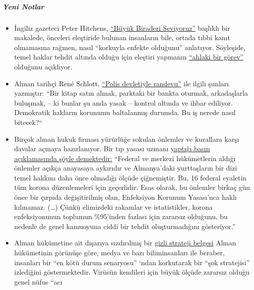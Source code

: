 \hypertarget{yeni-notlar}{%
\subparagraph{\texorpdfstring{\textbf{Yeni
Notlar}}{Yeni Notlar}}\label{yeni-notlar}}

\begin{itemize}
\tightlist
\item
  İngiliz gazeteci Peter Hitchens,
  \href{https://www.firstthings.com/web-exclusives/2020/04/we-love-big-brother}{``Büyük
  Biraderi Seviyoruz''} başlıklı bir makalede, önceleri eleştiride
  bulunan insanların bile, ortada tıbbi kanıt olmamasına rağmen, nasıl
  ``korkuyla enfekte olduğunu'' anlatıyor. Söyleşide, temel haklar
  tehdit altında olduğu için eleştiri yapmanın
  \href{https://www.spiked-online.com/podcast-episode/in-this-lockdown-dissent-is-a-moral-duty/}{``ahlaki
  bir görev''} olduğunu açıklıyor.
\item
  Alman tarihçi René Schlott,
  \href{https://www.spiegel.de/politik/deutschland/corona-krise-und-buergerrechte-rendezvous-mit-dem-polizeistaat-a-68611322-f4d4-453f-aba5-5ec5a49ae329}{``Polis
  devletiyle randevu''} ile ilgili şunları yazmıştır: ``Bir kitap satın
  almak, parktaki bir bankta oturmak, arkadaşlarla buluşmak, -- ki
  bunlar şu anda yasak -- kontrol altında ve ihbar ediliyor. Demokratik
  hakların korunumu baltalanmış durumda. Bu iş nerede nasıl bitecek?``
\item
  Birçok alman hukuk firması yürürlüğe sokulan önlemler ve kurallara
  karşı davalar açmaya hazırlanıyor. Bir tıp yasası uzmanı
  \href{http://beatebahner.de/lib.medien/aktualisierte\%20Pressemitteilung.pdf}{yaptığı
  basın açıklamasında şöyle demektedir:} ``Federal ve merkezi
  hükümetlerin aldığı önlemler açıkça anayasaya aykırıdır ve
  Almanya'daki yurttaşların bir dizi temel hakkını daha önce olmadığı
  ölçüde çiğnemiştir. Bu, 16 federal eyaletin tüm korona düzenlemeleri
  için geçerlidir. Esas olarak, bu önlemler birkaç gün önce bir çırpıda
  değişitirilmiş olan, Enfeksiyon Korunum Yasası'nca haklı kılınamaz.
  (\ldots{}) Çünkü elimizdeki rakamlar ve istatistikler, korona
  enfeksiyonunun toplumun \%95'inden fazlası için zararsız olduğunu, bu
  nedenle de genel kamuoyuna ciddi bir tehdit oluşturmadığını
  gösteriyor.''
\item
  Alman hükümetine ait dışarıya sızdırılmış bir
  \href{https://fragdenstaat.de/dokumente/4123-wie-wir-covid-19-unter-kontrolle-bekommen/}{gizli
  strateji belgesi} Alman hükümetinin görünüşe göre, medya ve bazı
  biliminsanları ile beraber, insanları bir ``en kötü durum senaryosu''
  `ndan korkutarak bir ``şok stratejisi'' izlediğini göstermektedir.
  Virüsün kendileri için büyük ölçüde zararsız olduğu genel nüfus ``acı

\end{itemize}
